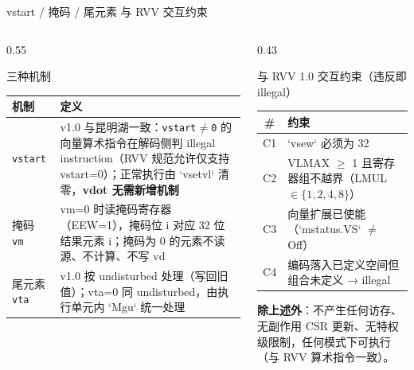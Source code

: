\documentclass[aspectratio=169]{beamer}
\newcommand{\smalltable}[1]{\par\centering\scriptsize #1\par}
\begin{document}
\begin{frame}{vstart / 掩码 / 尾元素 与 RVV 交互约束}
\begin{columns}[T]
\begin{column}{0.55\textwidth}
\begin{block}{三种机制}
\smalltable{%
\begin{tabular}{@{}p{2.2cm}p{8.2cm}@{}}
\toprule
机制 & 定义 \\
\midrule
\texttt{vstart} & v1.0 与昆明湖一致：\texttt{vstart$\neq$0} 的向量算术指令在解码侧判 illegal instruction（RVV 规范允许仅支持 vstart=0）；正常执行由 `vsetvl` 清零，\textbf{vdot 无需新增机制} \\
掩码 \texttt{vm} & vm=0 时读掩码寄存器（EEW=1），掩码位 i 对应 32 位结果元素 i；掩码为 0 的元素不读源、不计算、不写 vd \\
尾元素 \texttt{vta} & v1.0 按 undisturbed 处理（写回旧值）；vta=0 同 undisturbed，由执行单元内 `Mgu` 统一处理 \\
\bottomrule
\end{tabular}}
\end{block}
\end{column}
\begin{column}{0.43\textwidth}
\begin{block}{与 RVV 1.0 交互约束（违反即 illegal）}
\smalltable{%
\begin{tabular}{@{}cl@{}}
\toprule
\# & 约束 \\
\midrule
C1 & `vsew` 必须为 32 \\
C2 & VLMAX $\ge$ 1 且寄存器组不越界（LMUL $\in\{1,2,4,8\}$） \\
C3 & 向量扩展已使能（`mstatus.VS` $\neq$ Off） \\
C4 & 编码落入已定义空间但组合未定义 → illegal \\
\bottomrule
\end{tabular}}
\end{block}
\textbf{除上述外}：不产生任何访存、无副作用 CSR 更新、无特权级限制，任何模式下可执行（与 RVV 算术指令一致）。
\end{column}
\end{columns}
\end{frame}
\end{document}
